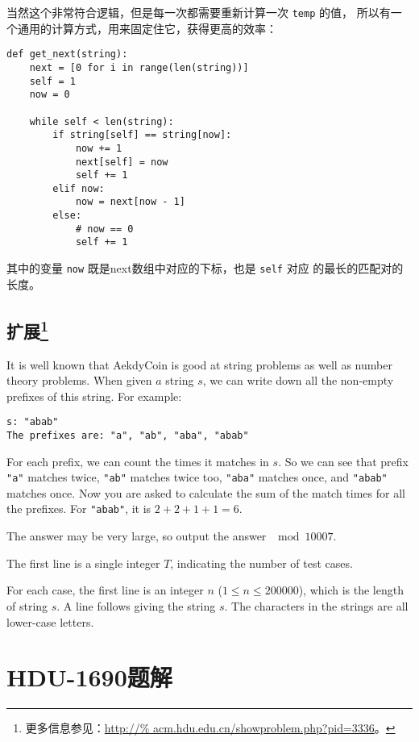 当然这个非常符合逻辑，但是每一次都需要重新计算一次 \verb|temp| 的值，
所以有一个通用的计算方式，用来固定住它，获得更高的效率：
\begin{lstlisting}
def get_next(string):
    next = [0 for i in range(len(string))]
    self = 1
    now = 0

    while self < len(string):
        if string[self] == string[now]:
            now += 1
            next[self] = now
            self += 1
        elif now:
            now = next[now - 1]
        else:
            # now == 0
            self += 1
\end{lstlisting}

其中的变量 \verb|now| 既是next数组中对应的下标，也是 \verb|self| 对应
的最长的匹配对的长度。

\subsection[扩展]{扩展\footnote{更多信息参见：\url{http://%
acm.hdu.edu.cn/showproblem.php?pid=3336}。}}

It is well known that AekdyCoin is good at string problems
as well as number theory problems. When given $a$ string $s$,
we can write down all the non-empty prefixes of this string.
For example:
\begin{lstlisting}
s: "abab"
The prefixes are: "a", "ab", "aba", "abab"
\end{lstlisting}

For each prefix, we can count the times it matches in $s$.
So we can see that prefix \verb|"a"| matches twice, \verb|"ab"|
matches twice too, \verb|"aba"| matches once, and \verb|"abab"|
matches once. Now you are asked to calculate the sum of the
match times for all the prefixes. For \verb|"abab"|, it is $2
+ 2 + 1 + 1 = 6$.

The answer may be very large, so output the answer $\mod 10007$.

The first line is a single integer $T$, indicating the number of
test cases.

For each case, the first line is an integer $n$ ($1 \le n \le 200000$),
which is the length of string $s$. A line follows giving the
string $s$. The characters in the strings are all lower-case letters.


\section{HDU-1690题解}

